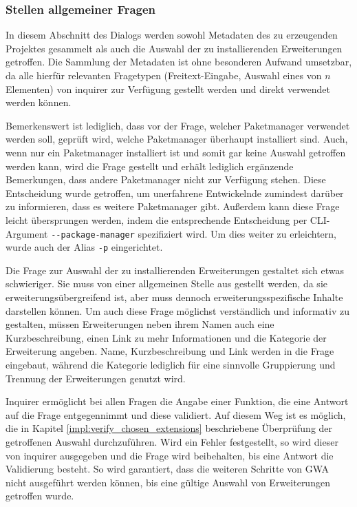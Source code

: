 \subsubsection{Stellen allgemeiner Fragen}
\label{impl:general_questions}
In diesem Abschnitt des Dialogs werden sowohl Metadaten des zu erzeugenden Projektes gesammelt als auch die Auswahl der zu installierenden Erweiterungen getroffen. Die Sammlung der Metadaten ist ohne besonderen Aufwand umsetzbar, da alle hierfür relevanten Fragetypen (Freitext-Eingabe, Auswahl eines von $n$ Elementen) von inquirer zur Verfügung gestellt werden und direkt verwendet werden können.

Bemerkenswert ist lediglich, dass vor der Frage, welcher Paketmanager verwendet werden soll, geprüft wird, welche Paketmanager überhaupt installiert sind. Auch, wenn nur ein Paketmanager installiert ist und somit gar keine Auswahl getroffen werden kann, wird die Frage gestellt und erhält lediglich ergänzende Bemerkungen, dass andere Paketmanager nicht zur Verfügung stehen. Diese Entscheidung wurde getroffen, um unerfahrene Entwickelnde zumindest darüber zu informieren, dass es weitere Paketmanager gibt. Außerdem kann diese Frage leicht übersprungen werden, indem die entsprechende Entscheidung per \gls{CLI}-Argument \verb|--package-manager| spezifiziert wird. Um dies weiter zu erleichtern, wurde auch der Alias \verb|-p| eingerichtet.

Die Frage zur Auswahl der zu installierenden Erweiterungen gestaltet sich etwas schwieriger. Sie muss von einer allgemeinen Stelle aus gestellt werden, da sie erweiterungsübergreifend ist, aber muss dennoch erweiterungsspezifische Inhalte darstellen können. Um auch diese Frage möglichst verständlich und informativ zu gestalten, müssen Erweiterungen neben ihrem Namen auch eine Kurzbeschreibung, einen Link zu mehr Informationen und die Kategorie der Erweiterung angeben. Name, Kurzbeschreibung und Link werden in die Frage eingebaut, während die Kategorie lediglich für eine sinnvolle Gruppierung und Trennung der Erweiterungen genutzt wird.

Inquirer ermöglicht bei allen Fragen die Angabe einer Funktion, die eine Antwort auf die Frage entgegennimmt und diese validiert. Auf diesem Weg ist es möglich, die in Kapitel \ref{impl:verify_chosen_extensions} beschriebene Überprüfung der getroffenen Auswahl durchzuführen. Wird ein Fehler festgestellt, so wird dieser von inquirer ausgegeben und die Frage wird beibehalten, bis eine Antwort die Validierung besteht. So wird garantiert, dass die weiteren Schritte von \gls{GWA} nicht ausgeführt werden können, bis eine gültige Auswahl von Erweiterungen getroffen wurde.

